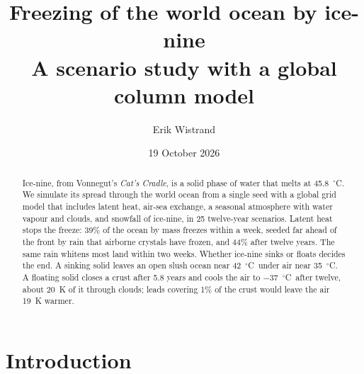 \documentclass[11pt,a4paper]{article}
\title{Freezing of the world ocean by ice-nine\\[4pt]\large A scenario study with a global column model}
\author{Erik Wistrand}
\date{19 October 2026}
\newcommand{\degC}{$^{\circ}$C}
\begin{document}
\maketitle

\begin{abstract}
Ice-nine, from Vonnegut's \emph{Cat's Cradle}, is a solid phase of water that melts at 45.8~\degC. We simulate its spread through the world ocean from a single seed with a global grid model that includes latent heat, air-sea exchange, a seasonal atmosphere with water vapour and clouds, and snowfall of ice-nine, in 25 twelve-year scenarios. Latent heat stops the freeze: 39\% of the ocean by mass freezes within a week, seeded far ahead of the front by rain that airborne crystals have frozen, and 44\% after twelve years. The same rain whitens most land within two weeks. Whether ice-nine sinks or floats decides the end. A sinking solid leaves an open slush ocean near 42~\degC\ under air near 35~\degC. A floating solid closes a crust after 5.8 years and cools the air to $-37$~\degC\ after twelve, about 20~K of it through clouds; leads covering 1\% of the crust would leave the air 19~K warmer.
\end{abstract}

\section{Introduction}
\end{document}
